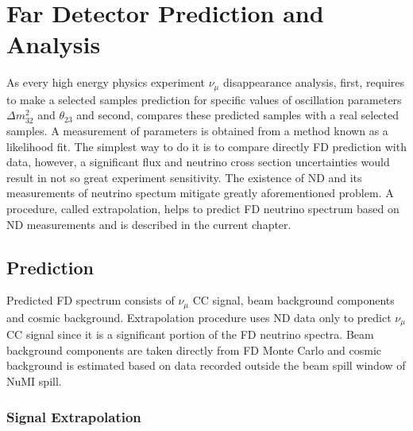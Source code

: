\chapter{Far Detector Prediction and Analysis}
\label{prediction_chapter}

As every high energy physics experiment $\nu_\mu$ disappearance analysis, first, requires to make
a selected samples prediction for specific values of oscillation parameters $\Delta m^2_{32}$ and 
$\theta_{23}$ and second, compares these predicted samples with a real selected samples. A measurement 
of parameters is obtained from a method known as a likelihood fit. The simplest way to do it is to 
compare directly FD prediction with data, however, a significant flux and neutrino cross section
uncertainties would result in not so great experiment sensitivity. The existence of ND and its measurements
of neutrino spectum mitigate greatly aforementioned problem. A procedure, called extrapolation, 
helps to predict FD neutrino spectrum based on ND measurements and is described in the current chapter.

\section{Prediction}
Predicted FD spectrum consists of $\nu_\mu$ CC signal, beam background components and cosmic background.
Extrapolation procedure uses ND data only to predict $\nu_\mu$ CC signal since it is a significant
portion of the FD neutrino spectra. Beam background components are taken directly from FD Monte Carlo
and cosmic background is estimated based on data recorded outside the beam spill window of NuMI spill. 

\subsection{Signal Extrapolation}

